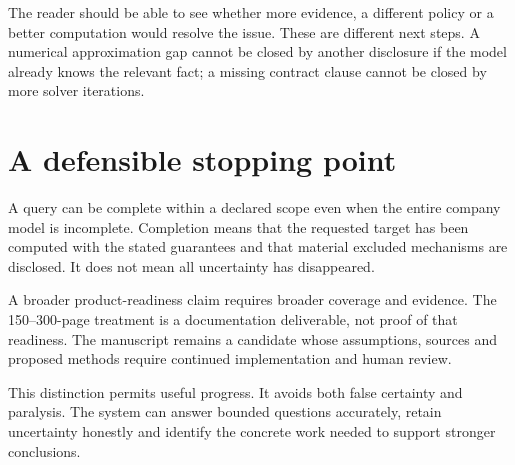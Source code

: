 The reader should be able to see whether more evidence, a different policy or a better computation would resolve the issue. These are different next steps. A numerical approximation gap cannot be closed by another disclosure if the model already knows the relevant fact; a missing contract clause cannot be closed by more solver iterations.

\section{A defensible stopping point}
A query can be complete within a declared scope even when the entire company model is incomplete. Completion means that the requested target has been computed with the stated guarantees and that material excluded mechanisms are disclosed. It does not mean all uncertainty has disappeared.

A broader product-readiness claim requires broader coverage and evidence. The 150--300-page treatment is a documentation deliverable, not proof of that readiness. The manuscript remains a candidate whose assumptions, sources and proposed methods require continued implementation and human review.

This distinction permits useful progress. It avoids both false certainty and paralysis. The system can answer bounded questions accurately, retain uncertainty honestly and identify the concrete work needed to support stronger conclusions.
